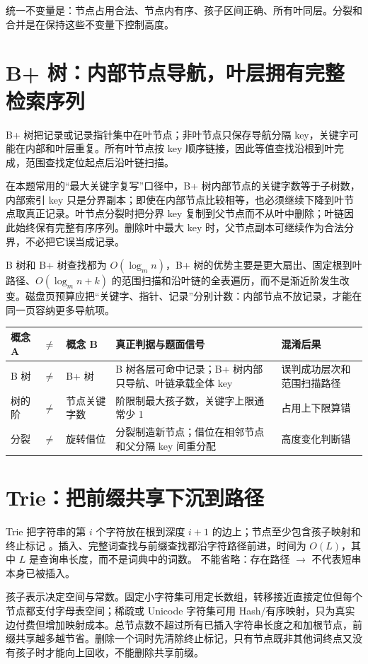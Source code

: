 \documentclass[UTF8,fontset=none,11pt,a4paper]{ctexart}
\begin{document}
统一不变量是：节点占用合法、节点内有序、孩子区间正确、所有叶同层。分裂和合并是在保持这些不变量下控制高度。

\section{B+ 树：内部节点导航，叶层拥有完整检索序列}
B+ 树把记录或记录指针集中在叶节点；非叶节点只保存导航分隔 key，关键字可能在内部和叶层重复。所有叶节点按 key 顺序链接，因此等值查找沿根到叶完成，范围查找定位起点后沿叶链扫描。

在本题常用的“最大关键字复写”口径中，B+ 树内部节点的关键字数等于子树数，内部索引 key 只是分界副本；即使在内部节点比较相等，也必须继续下降到叶节点取真正记录。叶节点分裂时把分界 key 复制到父节点而不从叶中删除；叶链因此始终保有完整有序序列。删除叶中最大 key 时，父节点副本可继续作为合法分界，不必把它误当成记录。

B 树和 B+ 树查找都为 $O(\log_m n)$，B+ 树的优势主要是更大扇出、固定根到叶路径、$O(\log_m n+k)$ 的范围扫描和沿叶链的全表遍历，而不是渐近阶发生改变。磁盘页预算应把“关键字、指针、记录”分别计数：内部节点不放记录，才能在同一页容纳更多导航项。

\begin{center}\small
\begin{tabularx}{\linewidth}{L{2.0cm}C{.35cm}L{2.0cm}YY}\toprule
概念 A&$\neq$&概念 B&真正判据与题面信号&混淆后果\\\midrule
B 树&$\neq$&B+ 树&B 树各层可命中记录；B+ 树内部只导航、叶链承载全体 key&误判成功层次和范围扫描路径\\
树的阶&$\neq$&节点关键字数&阶限制最大孩子数，关键字上限通常少 1&占用上下限算错\\
分裂&$\neq$&旋转借位&分裂制造新节点；借位在相邻节点和父分隔 key 间重分配&高度变化判断错\\\bottomrule
\end{tabularx}\end{center}

\section{Trie：把前缀共享下沉到路径}
Trie 把字符串的第 $i$ 个字符放在根到深度 $i+1$ 的边上；节点至少包含孩子映射和终止标记 。插入、完整词查找与前缀查找都沿字符路径前进，时间为 $O(L)$，其中 $L$ 是查询串长度，而不是词典中的词数。 不能省略：存在路径 $\to$ 不代表短串本身已被插入。

孩子表示决定空间与常数。固定小字符集可用定长数组，转移接近直接定位但每个节点都支付字母表空间；稀疏或 Unicode 字符集可用 Hash/有序映射，只为真实边付费但增加映射成本。总节点数不超过所有已插入字符串长度之和加根节点，前缀共享越多越节省。删除一个词时先清除终止标记，只有节点既非其他词终点又没有孩子时才能向上回收，不能删除共享前缀。
\end{document}

